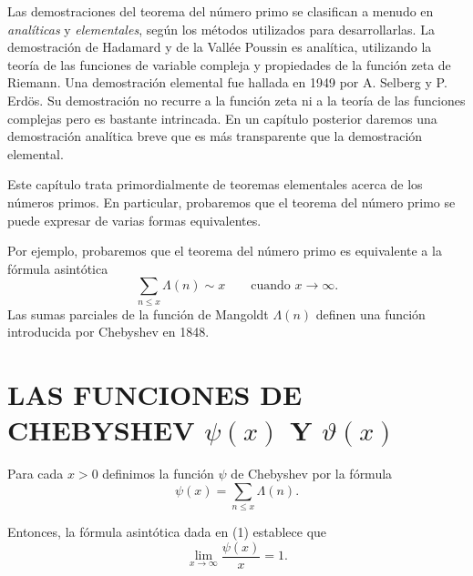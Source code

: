 \documentclass[12pt,a4paper]{book}
\begin{document}
    Las demostraciones del teorema del número primo se clasifican a menudo en
    \textit{analíticas} y \textit{elementales}, según los métodos utilizados para
    desarrollarlas. La demostración de Hadamard y de la Vallée Poussin es analítica,
    utilizando la teoría de las funciones de variable compleja y propiedades de la
    función zeta de Riemann. Una demostración elemental fue hallada en 1949 por
    A. Selberg y P. Erdös. Su demostración no recurre a la función zeta ni a la teoría
    de las funciones complejas pero es bastante intrincada. En un capítulo posterior
    daremos una demostración analítica breve que es más transparente que la
    demostración elemental.

    Este capítulo trata primordialmente de teoremas elementales acerca de los números
    primos. En particular, probaremos que el teorema del número primo se puede
    expresar de varias formas equivalentes.

    Por ejemplo, probaremos que el teorema del número primo es equivalente a la
    fórmula asintótica
    \begin{equation}
        \sum_{n\leq x}\Lambda(n)\sim x\qquad\text{cuando } x\to\infty.
    \end{equation}
    Las sumas parciales de la función de Mangoldt $\Lambda(n)$ definen una función
    introducida por Chebyshev en 1848.

    \section{LAS FUNCIONES DE CHEBYSHEV \texorpdfstring{$\psi(x)$}{ψ(x)} Y \texorpdfstring{$\vartheta(x)$}{ϑ(x)}}

    \begin{definicion}
        Para cada $x>0$ definimos la función $\psi$ de Chebyshev por la fórmula
        \begin{equation*}
            \psi(x)=\sum_{n\leq x}\Lambda(n).
        \end{equation*}
    \end{definicion}

    Entonces, la fórmula asintótica dada en (1) establece que
    \begin{equation}
        \lim_{x\to\infty}\frac{\psi(x)}{x}=1.
    \end{equation}
\end{document}
